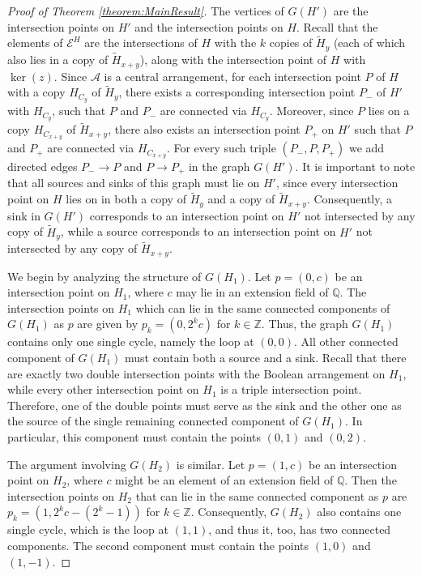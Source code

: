 \documentclass[12pt]{amsart}
\theoremstyle{definition}
\theoremstyle{remark}
\newcommand\CA{{\mathscr A}}
\newcommand\CE{{\mathscr E}}
\newcommand\BBQ{{\mathbb Q}}
\newcommand\BBZ{{\mathbb Z}}
\begin{document}
\begin{proof}[Proof of Theorem \ref{theorem:MainResult}]
The vertices of $G(H')$ are the intersection points on $H'$ and the intersection points on $H$. Recall that the elements of $\CE^H$ are the intersections of $H$ with the $k$ copies of $\tilde H_y$ (each of which also lies in a copy of $\tilde H_{x+y}$), along with the intersection point of $H$ with $\ker(z)$. Since $\CA$ is a central arrangement, for each intersection point $P$ of $H$ with a copy $H_{C_y}$ of $\tilde H_y$, there exists a corresponding intersection point $P_{-}$ of $H'$ with $H_{C_y}$, such that $P$ and $P_{-}$ are connected via $H_{C_y}$.
Moreover, since $P$ lies on a copy $H_{C_{x+y}}$ of $\tilde H_{x+y}$, there also exists an intersection point $P_{+}$ on $H'$ such that $P$ and $P_{+}$ are connected via $H_{C_{x+y}}$.
For every such triple $(P_{-},P,P_+)$ we add directed edges $P_{-} \rightarrow P$ and $P \rightarrow P_+$ in the graph $G(H')$.
It is important to note that all sources and sinks of this graph must lie on $H'$, since every intersection point on $H$ lies on in both a copy of $\tilde H_y$ and a copy of $\tilde H_{x+y}$.
Consequently, a sink in $G(H')$ corresponds to an intersection point on $H'$ not intersected by any copy of $\tilde H_y$, while a source corresponds to an intersection point on $H'$ not intersected by any copy of $\tilde H_{x+y}$.

We begin by analyzing the structure of $G(H_1)$. Let $p = (0,c)$ be an intersection point on $H_1$, where $c$ may lie in an extension field of $\BBQ$. The intersection points on $H_1$ which can lie in the same connected components of $G(H_1)$ as $p$ are given by $p_k = (0,2^kc)$ for $k \in \BBZ$. Thus, the graph $G(H_1)$ contains only one single cycle, namely the loop at $(0,0)$. All other connected component of $G(H_1)$ must contain both a source and a sink. Recall that there are exactly two double intersection points with the Boolean arrangement on $H_1$, while every other intersection point on $H_1$ is a triple intersection point. Therefore, one of the double points must serve as the sink and the other one as the source of the single remaining connected component of $G(H_1)$. In particular, this component must contain the points $(0,1)$ and $(0,2)$. 

The argument involving $G(H_2)$ is similar. Let $p = (1,c)$ be an intersection point on $H_2$, where $c$ might be an element of an extension field of $\BBQ$. Then the intersection points on $H_2$ that can lie in the same connected component as $p$ are $p_k = (1,2^kc-(2^k-1))$ for $k \in \BBZ$. Consequently, $G(H_2)$ also contains one single cycle, which is the loop at $(1,1)$, and thus it, too, has two connected components. The second component must contain the points $(1,0)$ and $(1,-1)$.


\end{proof}
\end{document}
